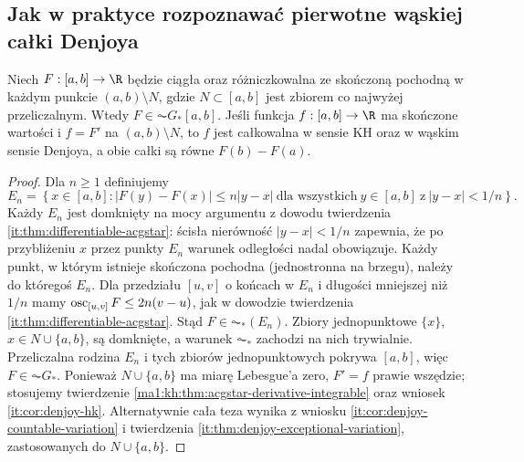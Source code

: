 \subsection{Jak w praktyce rozpoznawać pierwotne wąskiej całki Denjoya}
\begin{twierdzenie}\label{ma1:kh:tw:denjoy-countable}\label{tw:denjoy-countable}
Niech $F:[a,b]\to\R$ będzie ciągła oraz różniczkowalna ze skończoną pochodną w każdym punkcie $(a,b)\setminus N$, gdzie $N\subset[a,b]$ jest zbiorem co najwyżej przeliczalnym. Wtedy $F\in\AC G_*[a,b]$. Jeśli funkcja $f:[a,b]\to\R$ ma skończone wartości i $f=F'$ na $(a,b)\setminus N$, to $f$ jest całkowalna w sensie KH oraz w wąskim sensie Denjoya, a obie całki są równe $F(b)-F(a)$.
\end{twierdzenie}
\begin{proof}
Dla $n\ge1$ definiujemy
\[
 E_n=\left\{x\in[a,b]: |F(y)-F(x)|\le n|y-x|
 \ \text{dla wszystkich}\ y\in[a,b]\ \text{z}\ |y-x|<1/n\right\}.
\]
Każdy $E_n$ jest domknięty na mocy argumentu z dowodu twierdzenia \ref{it:thm:differentiable-acgstar}: ścisła nierówność $|y-x|<1/n$ zapewnia, że po przybliżeniu $x$ przez punkty $E_n$ warunek odległości nadal obowiązuje. Każdy punkt, w którym istnieje skończona pochodna (jednostronna na brzegu), należy do któregoś $E_n$. Dla przedziału $[u,v]$ o końcach w $E_n$ i długości mniejszej niż $1/n$ mamy
$\operatorname{osc}_{[u,v]}F\le2n(v-u)$, jak w dowodzie twierdzenia \ref{it:thm:differentiable-acgstar}. Stąd $F\in\AC_*(E_n)$. Zbiory jednopunktowe $\{x\}$, $x\in N\cup\{a,b\}$, są domknięte, a warunek $\AC_*$ zachodzi na nich trywialnie. Przeliczalna rodzina $E_n$ i tych zbiorów jednopunktowych pokrywa $[a,b]$, więc $F\in\AC G_*$. Ponieważ $N\cup\{a,b\}$ ma miarę Lebesgue'a zero, $F'=f$ prawie wszędzie; stosujemy twierdzenie \ref{ma1:kh:thm:acgstar-derivative-integrable} oraz wniosek \ref{it:cor:denjoy-hk}. Alternatywnie cała teza wynika z wniosku \ref{it:cor:denjoy-countable-variation} i twierdzenia \ref{it:thm:denjoy-exceptional-variation}, zastosowanych do $N\cup\{a,b\}$.
\end{proof}
